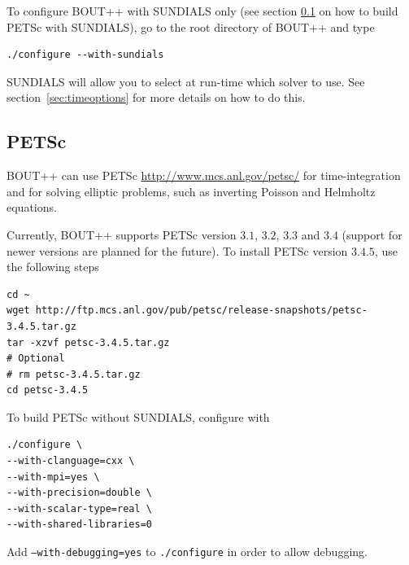\documentclass[12pt]{article}
\begin{document}
To configure BOUT++ with SUNDIALS only (see section \ref{sec:PETSc} on how to
build PETSc with SUNDIALS), go to the root directory of BOUT++ and type
%
\begin{verbatim}
./configure --with-sundials
\end{verbatim}
%
SUNDIALS will allow you to select at run-time which solver to use. See
section~\ref{sec:timeoptions} for more details on how to do this.



\subsection{PETSc}
%
\label{sec:PETSc}
%
BOUT++ can use PETSc \url{http://www.mcs.anl.gov/petsc/} for time-integration
and for solving elliptic problems, such as inverting Poisson and Helmholtz
equations.

Currently, BOUT++ supports PETSc version $3.1$, $3.2$, $3.3$ and $3.4$ (support
for newer versions are planned for the future). To install PETSc version
$3.4.5$, use the following steps
%
\begin{verbatim}
cd ~
wget http://ftp.mcs.anl.gov/pub/petsc/release-snapshots/petsc-3.4.5.tar.gz
tar -xzvf petsc-3.4.5.tar.gz
# Optional
# rm petsc-3.4.5.tar.gz
cd petsc-3.4.5
\end{verbatim}
%
To build PETSc without SUNDIALS, configure with
%
\begin{verbatim}
./configure \
--with-clanguage=cxx \
--with-mpi=yes \
--with-precision=double \
--with-scalar-type=real \
--with-shared-libraries=0
\end{verbatim}
%
Add \texttt{--with-debugging=yes} to \texttt{./configure} in order to allow
debugging.
\end{document}
